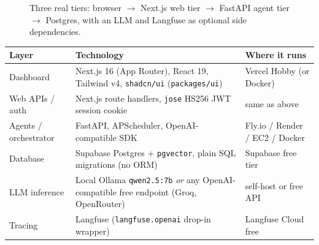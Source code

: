\documentclass[11pt,a4paper]{article}
\begin{document}
\begin{figure}[h]
{%
}
\caption{Three real tiers: browser $\to$ Next.js web tier $\to$ FastAPI agent tier $\to$ Postgres, with an LLM and Langfuse as optional side dependencies.}
\end{figure}

\begin{center}
\begin{tabular}{@{}p{2.4cm}p{6.2cm}p{5.6cm}@{}}
\toprule
\textbf{Layer} & \textbf{Technology} & \textbf{Where it runs} \\
\midrule
Dashboard & Next.js 16 (App Router), React 19, Tailwind v4, \texttt{shadcn/ui} (\texttt{packages/ui}) & Vercel Hobby (or Docker) \\
Web APIs / auth & Next.js route handlers, \texttt{jose} HS256 JWT session cookie & same as above \\
Agents / orchestrator & FastAPI, APScheduler, OpenAI-compatible SDK & Fly.io / Render / EC2 / Docker \\
Database & Supabase Postgres + \texttt{pgvector}, plain SQL migrations (no ORM) & Supabase free tier \\
LLM inference & Local Ollama \texttt{qwen2.5:7b} \emph{or} any OpenAI-compatible free endpoint (Groq, OpenRouter) & self-host or free API \\
Tracing & Langfuse (\texttt{langfuse.openai} drop-in wrapper) & Langfuse Cloud free \\
\bottomrule
\end{tabular}
\end{center}
\end{document}
